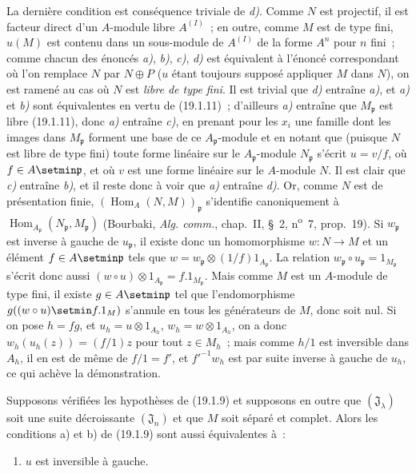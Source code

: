 La dernière condition est conséquence triviale de \emph{d)}. Comme $N$ est
projectif, il est facteur direct d'un $A$-module libre $A^{(I)}$~; en outre,
comme $M$ est de type fini, $u(M)$ est contenu dans un sous-module de $A^{(I)}$
de la forme $A^n$ pour $n$ fini~; comme chacun des énoncés \emph{a)}, \emph{b)}, \emph{c)}, \emph{d)} est
équivalent à l'énoncé correspondant où l'on remplace $N$ par $N\oplus P$ ($u$
étant toujours supposé appliquer $M$ dans $N$), on est ramené au cas où $N$
est \emph{libre de type fini}. Il est trivial que \emph{d)} entraîne \emph{a)}, et \emph{a)} et \emph{b)}
sont équivalentes en vertu de (19.1.11)~; d'ailleurs \emph{a)} entraîne que
$M_{\mathfrak p}$ est libre (19.1.11), donc \emph{a)} entraîne \emph{c)}, en prenant pour les
$x_i$ une famille dont les images dans $M_{\mathfrak p}$ forment une base de ce
$A_{\mathfrak p}$-module et en notant que (puisque $N$ est libre de type fini)
toute forme linéaire sur le $A_{\mathfrak p}$-module $N_{\mathfrak p}$ s'écrit
$u=v/f$, où $f\in A\setmin\mathfrak p$, et où $v$ est une forme linéaire sur le
$A$-module $N$. Il est clair que \emph{c)} entraîne \emph{b)}, et il reste donc à voir que \emph{a)}
entraîne \emph{d)}. Or, comme $N$ est de présentation finie,
$(\operatorname{Hom}_A(N,M))_{\mathfrak p}$ s'identifie canoniquement à
$\operatorname{Hom}_{A_{\mathfrak p}}(N_{\mathfrak p},M_{\mathfrak p})$
(Bourbaki, \emph{Alg. comm.}, chap.~II, §~2, n\textsuperscript{o}~7,
prop.~19). Si $w_{\mathfrak p}$ est inverse à gauche de $u_{\mathfrak p}$, il
existe donc un homomorphisme $w:N\to M$ et un élément $f\in A\setmin\mathfrak p$
tels que $w=w_{\mathfrak p}\otimes(1/f)1_{A_{\mathfrak p}}$. La relation
$w_{\mathfrak p}\circ u_{\mathfrak p}=1_{M_{\mathfrak p}}$ s'écrit donc aussi
$(w\circ u)\otimes1_{A_{\mathfrak p}}=f.1_{M_{\mathfrak p}}$. Mais comme $M$
est un $A$-module de type fini, il existe $g\in A\setmin\mathfrak p$ tel que
l'endomorphisme $g((w\circ u)\setmin f.1_M)$ s'annule en tous les générateurs de $M$,
donc soit nul. Si on pose $h=fg$, et
$u_h=u\otimes1_{A_h}$, $w_h=w\otimes1_{A_h}$, on a donc
$w_h(u_h(z))=(f/1)z$ pour tout $z\in M_h$~; mais comme $h/1$ est inversible
dans $A_h$, il en est de même de $f/1=f'$, et $f'^{-1}w_h$ est par suite
inverse à gauche de $u_h$, ce qui achève la démonstration.

\begin{proposition}[19.1.13]
\label{0.19.1.13-fr}
Supposons vérifiées les hypothèses de \textup{(19.1.9)} et supposons en outre que
$(\mathfrak J_\lambda)$ soit une suite décroissante $(\mathfrak J_n)$ et que
$M$ soit séparé et complet. Alors les conditions \textup{a)} et \textup{b)} de \textup{(19.1.9)} sont
aussi équivalentes à~:
\begin{enumerate}
  \item[\textup{c)}] $u$ est inversible à gauche.
\end{enumerate}
\end{proposition}

